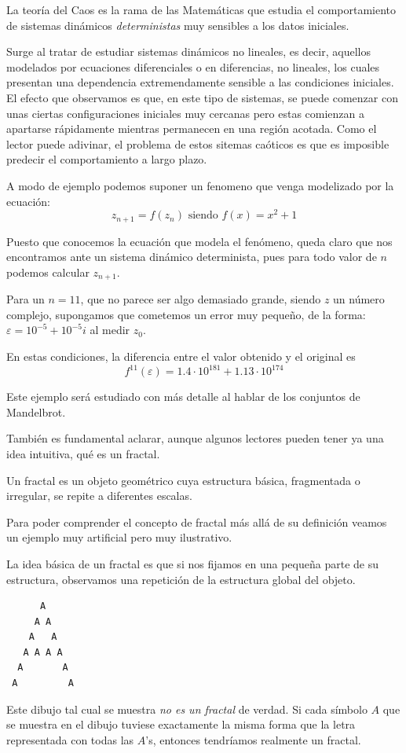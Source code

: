 \begin{definition}
La teoría del Caos es la rama de las Matemáticas que estudia el comportamiento de sistemas dinámicos \emph{deterministas} muy sensibles a los datos iniciales.
\end{definition}
Surge al tratar de estudiar sistemas dinámicos no lineales, es decir, aquellos modelados por ecuaciones diferenciales o en diferencias, no lineales, los cuales presentan una dependencia extremendamente sensible a las condiciones iniciales. El efecto que observamos es que, en este tipo de sistemas, se puede comenzar con unas ciertas configuraciones iniciales muy cercanas pero estas comienzan a apartarse rápidamente mientras permanecen en una región acotada. Como el lector puede adivinar, el problema de estos sitemas caóticos es que es imposible predecir el comportamiento a largo plazo.
\begin{example}\label{example:Julia}
A modo de ejemplo podemos suponer un fenomeno que venga modelizado por la ecuación:
\[z_{n+1} = f(z_n) \text{ siendo } f(x) = x^2+1\]

Puesto que conocemos la ecuación que modela el fenómeno, queda claro que nos encontramos ante un sistema dinámico determinista, pues para todo valor de $n$ podemos calcular $z_{n+1}$.

Para un $n=11$, que no parece ser algo demasiado grande, siendo $z$ un número complejo, supongamos que cometemos un error muy pequeño, de la forma: $ε=10^{-5}+10^{-5}i$ al medir $z_0$.

En estas condiciones, la diferencia entre el valor obtenido y el original es
\[f^{11}(ε)=1.4 \cdot 10^{181} + 1.13\cdot 10^{174}\]

Este ejemplo será estudiado con más detalle al hablar de los conjuntos de Mandelbrot.
\end{example}

También es fundamental aclarar, aunque algunos lectores pueden tener ya una idea intuitiva, qué es un fractal.

\begin{definition}[Fractal]\label{def:fractal}
Un fractal es un objeto geométrico cuya estructura básica, fragmentada o irregular, se repite a diferentes escalas.
\end{definition}

Para poder comprender el concepto de fractal más allá de su definición veamos un ejemplo muy artificial pero muy ilustrativo.

\begin{example}
La idea básica de un fractal es que si nos fijamos en una pequeña parte de su estructura, observamos una repetición de la estructura global del objeto.

\begin{verbatim}
      A
     A A
    A   A
   A A A A
  A       A
 A         A
\end{verbatim}

Este dibujo tal cual se muestra \emph{no es un fractal} de verdad. Si cada símbolo $A$ que se muestra en el dibujo tuviese exactamente la misma forma que la letra representada con todas las $A$'s, entonces tendríamos realmente un fractal.
\end{example}

